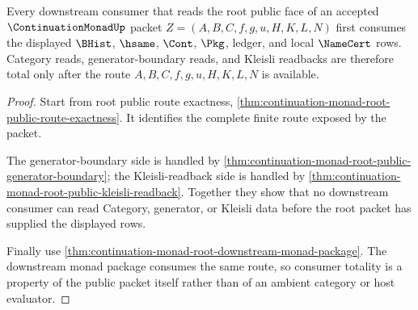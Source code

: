 \begin{theorem}
\label{thm:continuation-monad-root-consumer-totality}
Every downstream consumer that reads the root public face of an accepted
$\ContinuationMonadUp$ packet $Z=(A,B,C,f,g,u,H,K,L,N)$ first consumes the
displayed $\BHist$, $\hsame$, $\Cont$, $\Pkg$, ledger, and local $\NameCert$
rows. Category reads, generator-boundary reads, and Kleisli readbacks are
therefore total only after the route $A,B,C,f,g,u,H,K,L,N$ is available.
\end{theorem}
\begin{proof}
Start from root public route exactness,
\autoref{thm:continuation-monad-root-public-route-exactness}. It identifies the
complete finite route exposed by the packet.

The generator-boundary side is handled by
\autoref{thm:continuation-monad-root-public-generator-boundary}; the
Kleisli-readback side is handled by
\autoref{thm:continuation-monad-root-public-kleisli-readback}. Together they
show that no downstream consumer can read Category, generator, or Kleisli data
before the root packet has supplied the displayed rows.

Finally use \autoref{thm:continuation-monad-root-downstream-monad-package}. The
downstream monad package consumes the same route, so consumer totality is a
property of the public packet itself rather than of an ambient category or host
evaluator.
\end{proof}

